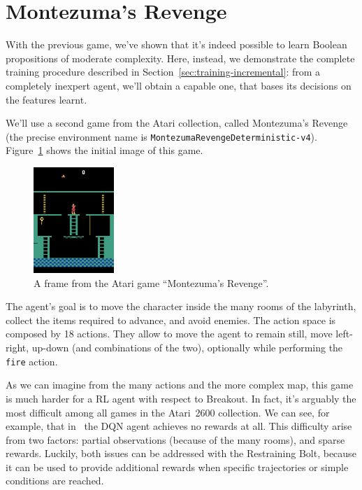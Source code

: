 \let\sectionbreak\savedsectionbreak

\section{Montezuma's Revenge}

With the previous game, we've shown that it's indeed possible to learn Boolean
propositions of moderate complexity. Here, instead, we demonstrate the
complete training procedure described in
Section~\ref{sec:training-incremental}: from a completely inexpert agent,
we'll obtain a capable one, that bases its decisions on the features learnt.

We'll use a second game from the Atari collection, called Montezuma's Revenge
(the precise environment name is
\verb|MontezumaRevengeDeterministic-v4|). Figure~\ref{fig:mz-frame} shows the
initial image of this game.
\begin{figure}
	\centering
	\includegraphics[height=4cm]{./imgs/mz0.png}
	\caption{A frame from the Atari game ``Montezuma's Revenge''.}
	\label{fig:mz-frame}
\end{figure}
The agent's goal is to move the character inside the many rooms of the
labyrinth, collect the items required to advance, and avoid enemies. The
action space is composed by 18 actions. They allow to move the agent to remain
still, move left-right, up-down (and combinations of the two), optionally
while performing the \texttt{fire} action.

As we can imagine from the many actions and the more complex map, this game is
much harder for a RL agent with respect to Breakout. In fact, it's
arguably the most difficult among all games in the Atari~2600 collection. We
can see, for example, that in~\cite{bib:atari-deepq-nature} the DQN agent
achieves no rewards at all. This difficulty arise from two factors: partial
observations (because of the many rooms), and sparse rewards. Luckily, both
issues can be addressed with the Restraining Bolt, because it can be used to
provide additional rewards when specific trajectories or simple conditions are
reached.


